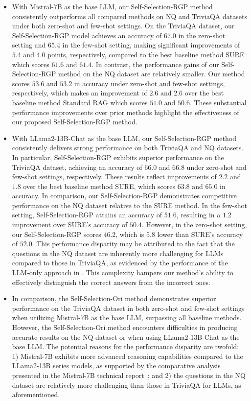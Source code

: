 \begin{itemize}[leftmargin=*,nosep]
\item With Mistral-7B as the base LLM, our Self-Selection-RGP method consistently outperforms all compared methods on NQ and TriviaQA datasets under both zero-shot and few-shot settings.
On the TriviaQA dataset, our Self-Selection-RGP model achieves an accuracy of $67.0$ in the zero-shot setting and $65.4$ in the few-shot setting, making significant improvements of $5.4$ and $4.0$ points, respectively, compared to the best baseline method SURE which scores  $61.6$ and $61.4$.
In contrast, the performance gains of our Self-Selection-RGP method on the NQ dataset are relatively smaller.
Our method scores $53.6$ and $53.2$ in accuracy under zero-shot and few-shot settings, respectively, which makes an improvement of $2.6$ and $2.6$ over the best baseline method Standard RAG which scores $51.0$ and  $50.6$.
These substantial performance improvements over prior methods highlight the effectiveness of our proposed Self-Selection-RGP method.
\item With LLama2-13B-Chat as the base LLM, our Self-Selection-RGP method consistently delivers strong performance on both TriviaQA and NQ datasets. 
In particular, Self-Selection-RGP exhibits superior performance on the TriviaQA dataset, achieving an accuracy of $66.0$ and $66.8$ under zero-shot and few-shot settings, respectively. 
These results reflect improvements of $2.2$ and $1.8$ over the best baseline method SURE, which scores $63.8$ and $65.0$ in accuracy.
In comparison, our Self-Selection-RGP demonstrates competitive performance on the NQ dataset relative to the SURE method.
In the few-shot setting, Self-Selection-RGP attains an accuracy of $51.6$, resulting in a $1.2$ improvement over SURE’s accuracy of $50.4$. 
However, in the zero-shot setting, our Self-Selection-RGP scores $46.2$, which is $5.8$ lower than SURE’s accuracy of $52.0$.
This performance disparity may be attributed to the fact that the questions in the NQ dataset are inherently more challenging for LLMs compared to those in TriviaQA, as evidenced by the performance of the LLM-only approach in .
This complexity hampers our method's ability to effectively distinguish the correct answers from the incorrect ones.
\item In comparison, the Self-Selection-Ori method demonstrates superior performance on the TriviaQA dataset in both zero-shot and few-shot settings when utilizing Mistral-7B as the base LLM, surpassing all baseline methods.
However, the Self-Selection-Ori method encounters difficulties in producing accurate results on the NQ dataset or when using LLama2-13B-Chat as the base LLM. 
The potential reasons for the performance disparity are twofold: 1) Mistral-7B exhibits more advanced reasoning capabilities compared to the LLama2-13B series models, as supported by the comparative analysis presented in the Mistral-7B technical report~\cite{jiang2023mistral7b}; and 2) the questions in the NQ dataset are relatively more challenging than those in TriviaQA for LLMs, as aforementioned.
\end{itemize}



